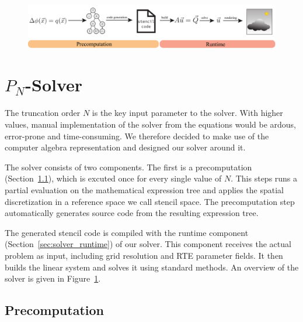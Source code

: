 \begin{figure}[t!]
\centering
\includegraphics[width=\textwidth]{figures/fig_pipeline.pdf}
\vspace{-0.2in}
\label{fig:pnsolver}
\end{figure}


\section{$P_N$-Solver}
\label{sec:pnsolver}

The truncation order $N$ is the key input parameter to the solver. With higher values, manual implementation of the solver from the equations would be ardous, error-prone and time-consuming. We therefore decided to make use of the computer algebra representation and designed our solver around it.

The solver consists of two components. The first is a precomputation (Section~\ref{sec:solver_precomputation}), which is excuted once for every single value of $N$. This steps runs a partial evaluation on the mathematical expression tree and applies the spatial discretization in a reference space we call stencil space. The precomputation step automatically generates source code from the resulting expression tree.

The generated stencil code is compiled with the runtime component (Section~\ref{sec:solver_runtime}) of our solver. This component receives the actual problem as input, including grid resolution and RTE parameter fields. It then builds the linear system and solves it using standard methods. An overview of the solver is given in Figure~\ref{fig:pnsolver}.



\subsection{Precomputation}
\label{sec:solver_precomputation}

